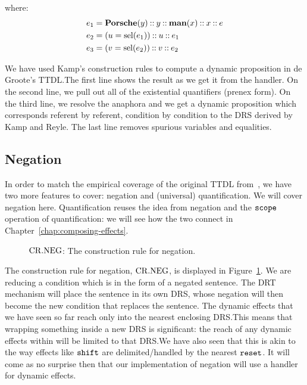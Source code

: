 where:
\vspace{-1mm}
\begin{align*}
  e_1 &= \textbf{Porsche}(y) \mathbin{::} y \mathbin{::} \textbf{man}(x) \mathbin{::} x \mathbin{::} e \\
  e_2 &= (u = \operatorname{sel}(e_1)) \mathbin{::} u \mathbin{::} e_1 \\
  e_3 &= (v = \operatorname{sel}(e_2)) \mathbin{::} v \mathbin{::} e_2
\end{align*}

We have used Kamp's construction rules to compute a dynamic proposition in
de Groote's TTDL.\@ The first line shows the result as we get it from the
handler. On the second line, we pull out all of the existential quantifiers
(prenex form). On the third line, we resolve the anaphora and we get a
dynamic proposition which corresponds referent by referent, condition by
condition to the DRS derived by Kamp and Reyle. The last line removes
spurious variables and equalities.


\subsection{Negation}
\label{ssec:dynamic-negation}

In order to match the empirical coverage of the original TTDL
from~\cite{de2006towards}, we have two more features to cover: negation and
(universal) quantification. We will cover negation here. Quantification
reuses the idea from negation and the $\mathtt{scope}$ operation of
quantification: we will see how the two connect in
Chapter~\ref{chap:composing-effects}.

\begin{figure}
  \centering
  \crnegbox
  \caption{\label{fig:crneg} $\mathrm{CR.NEG}$: The construction rule for negation.}
\end{figure}

The construction rule for negation, $\mathrm{CR.NEG}$, is displayed in
Figure~\ref{fig:crneg}. We are reducing a condition which is in the form of
a negated sentence. The DRT mechanism will place the sentence in its own
DRS, whose negation will then become the new condition that replaces the
sentence. The dynamic effects that we have seen so far reach only into the
nearest enclosing DRS.\@ This means that wrapping something inside a new
DRS is significant: the reach of any dynamic effects within will be limited
to that DRS.\@ We have also seen that this is akin to the way effects like
$\mathtt{shift}$ are delimited/handled by the nearest $\mathtt{reset}$. It will come as no
surprise then that our implementation of negation will use a handler for
dynamic effects.


